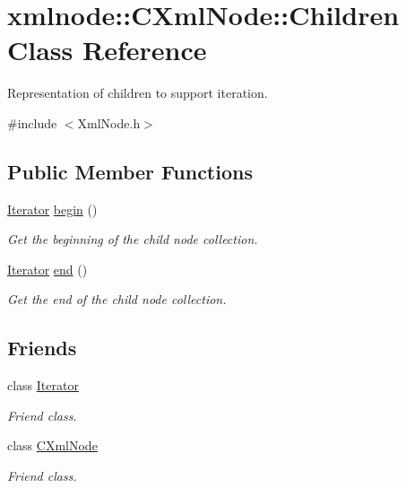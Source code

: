 \hypertarget{classxmlnode_1_1_c_xml_node_1_1_children}{}\section{xmlnode\+::C\+Xml\+Node\+::Children Class Reference}
\label{classxmlnode_1_1_c_xml_node_1_1_children}


Representation of children to support iteration.  




{\ttfamily \#include $<$Xml\+Node.\+h$>$}

\subsection*{Public Member Functions}
\begin{DoxyCompactItemize}
\item 
\mbox{\hyperlink{classxmlnode_1_1_c_xml_node_1_1_iterator}{Iterator}} \mbox{\hyperlink{classxmlnode_1_1_c_xml_node_1_1_children_a8f0cac16fdda64bbf10cb08eba606dd1}{begin}} ()
\begin{DoxyCompactList}\small\item\em Get the beginning of the child node collection. \end{DoxyCompactList}\item 
\mbox{\hyperlink{classxmlnode_1_1_c_xml_node_1_1_iterator}{Iterator}} \mbox{\hyperlink{classxmlnode_1_1_c_xml_node_1_1_children_a3fe6fb9e62c63d6a9ea46653608d42e8}{end}} ()
\begin{DoxyCompactList}\small\item\em Get the end of the child node collection. \end{DoxyCompactList}\end{DoxyCompactItemize}
\subsection*{Friends}
\begin{DoxyCompactItemize}
\item 
\mbox{\label{classxmlnode_1_1_c_xml_node_1_1_children_a9830fc407400559db7e7783cc10a9394}} 
class \mbox{\hyperlink{classxmlnode_1_1_c_xml_node_1_1_children_a9830fc407400559db7e7783cc10a9394}{Iterator}}
\begin{DoxyCompactList}\small\item\em Friend class. \end{DoxyCompactList}\item 
\mbox{\label{classxmlnode_1_1_c_xml_node_1_1_children_a770307dc9d4e2e7005bcf200bae3066a}} 
class \mbox{\hyperlink{classxmlnode_1_1_c_xml_node_1_1_children_a770307dc9d4e2e7005bcf200bae3066a}{C\+Xml\+Node}}
\begin{DoxyCompactList}\small\item\em Friend class. \end{DoxyCompactList}\end{DoxyCompactItemize}



